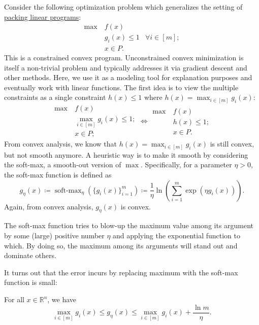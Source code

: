 Consider the following optimization problem which generalizes the setting of \hyperref[def:packing-LP]{packing linear programs}:
\[
	\begin{aligned}
		\max~ & f(x)                                 \\
		      & g_i (x) \leq 1 & \forall i \in [m] ; \\
		      & x\in P.
	\end{aligned}
\]
This is a constrained convex program. Unconstrained convex minimization is itself a non-trivial problem and typically addresses it via gradient descent and other methods. Here, we use it as a modeling tool for explanation purposes and eventually work with linear functions. The first idea is to view the multiple constraints as a single constraint \(h(x) \leq 1\) where \(h(x) = \max _{i \in [m]} g_i(x)\):
\[
	\begin{aligned}
		\max~ & f(x)                               \\
		      & \max _{i \in [m]} g_i (x) \leq 1 ; \\
		      & x\in P;
	\end{aligned}
	\iff \begin{aligned}
		\max~ & f(x)          \\
		      & h(x) \leq 1 ; \\
		      & x\in P.
	\end{aligned}
\]
From convex analysis, we know that \(h(x) = \max _{i \in [m]}g_i(x)\) is still convex, but not smooth anymore. A heuristic way is to make it smooth by considering the soft-max, a smooth-out version of \(\max\). Specifically, for a parameter \(\eta > 0\), the soft-max function is defined as
\[
	g_\eta (x)
	\coloneqq \operatorname{soft-max}_\eta (\{ g_i (x)\}_{i=1}^{m} )
	\coloneqq \frac{1}{\eta } \ln ( \sum_{i=1}^{m} \exp (\eta g_i(x) )).
\]
Again, from convex analysis, \(g_\eta (x)\) is convex.

\begin{intuition}
	The soft-max function tries to blow-up the maximum value among its argument by some (large) positive number \(\eta \) and applying the exponential function to which. By doing so, the maximum among its arguments will stand out and dominate others.
\end{intuition}

It turns out that the error incurs by replacing maximum with the soft-max function is small:

\begin{claim}
	For all \(x \in \mathbb{R} ^n\), we have
	\[
		\max _{i \in [m]} g_i(x)
		\leq g_\eta (x)
		\leq \max _{i \in [m]} g_i(x) + \frac{\ln m}{\eta }.
	\]
\end{claim}

